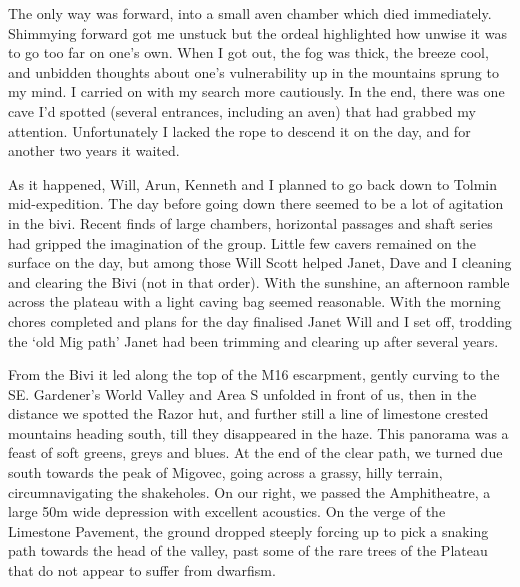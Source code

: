 The only way was forward, into a small aven chamber which died immediately. Shimmying forward got me unstuck but the ordeal highlighted how unwise it was to go too far on one’s own. When I got out, the fog was thick, the breeze cool, and unbidden thoughts about one’s vulnerability up in the mountains sprung to my mind. I carried on with my search more cautiously. In the end, there was one cave I’d spotted (several entrances, including an aven) that had grabbed my attention. Unfortunately I lacked the rope to descend it on the day, and for another two years it waited.

As it happened, Will, Arun, Kenneth and I planned to go back down to Tolmin mid-expedition. The day before going down there seemed to be a lot of agitation in the bivi. Recent finds of large chambers, horizontal passages and shaft series had gripped the imagination of the group. Little few cavers remained on the surface on the day, but among those Will Scott helped Janet, Dave and I cleaning and clearing the Bivi (not in that order). With the sunshine, an afternoon ramble across the plateau with a light caving bag seemed reasonable. With the morning chores completed and plans for the day finalised Janet Will and I set off, trodding the ‘old Mig path’ Janet had been trimming and clearing up after several years. 

From the Bivi it led along the top of the M16 escarpment, gently curving to the SE. Gardener’s World Valley and Area S unfolded in front of us, then in the distance we spotted the Razor hut, and further still a line of limestone crested mountains heading south, till they disappeared in the haze. This panorama was a feast of soft greens, greys and blues. At the end of the clear path, we turned due south towards the peak of Migovec, going across a grassy, hilly terrain, circumnavigating the shakeholes. On our right, we passed the Amphitheatre, a large 50m wide depression with excellent acoustics. On the verge of the Limestone Pavement, the ground dropped steeply forcing up to pick a snaking path towards the head of the valley, past some of the rare trees of the Plateau that do not appear to suffer from dwarfism. 

